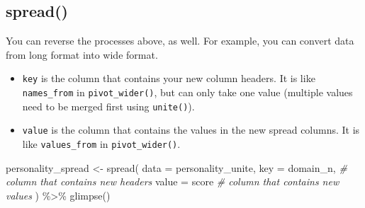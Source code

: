 \documentclass[
  oneside]{book}
\newenvironment{Shaded}{\begin{snugshade}}{\end{snugshade}}
\newcommand{\AttributeTok}[1]{\textcolor[rgb]{0.77,0.63,0.00}{#1}}
\newcommand{\CommentTok}[1]{\textcolor[rgb]{0.56,0.35,0.01}{\textit{#1}}}
\newcommand{\FunctionTok}[1]{\textcolor[rgb]{0.00,0.00,0.00}{#1}}
\newcommand{\NormalTok}[1]{#1}
\newcommand{\OtherTok}[1]{\textcolor[rgb]{0.56,0.35,0.01}{#1}}
\newcommand{\SpecialCharTok}[1]{\textcolor[rgb]{0.00,0.00,0.00}{#1}}
\providecommand{\tightlist}{%
  \setlength{\itemsep}{0pt}\setlength{\parskip}{0pt}}
\begin{document}
\hypertarget{spread}{%
\subsection{spread()}\label{spread}}

You can reverse the processes above, as well. For example, you can convert data from long format into wide format.

\begin{itemize}
\tightlist
\item
  \texttt{key} is the column that contains your new column headers. It is like \texttt{names\_from} in \texttt{pivot\_wider()}, but can only take one value (multiple values need to be merged first using \texttt{unite()}).
\item
  \texttt{value} is the column that contains the values in the new spread columns. It is like \texttt{values\_from} in \texttt{pivot\_wider()}.
\end{itemize}

\begin{Shaded}
\begin{Highlighting}[]
\NormalTok{personality\_spread }\OtherTok{\textless{}{-}} \FunctionTok{spread}\NormalTok{(}
  \AttributeTok{data =}\NormalTok{ personality\_unite,}
  \AttributeTok{key =}\NormalTok{ domain\_n, }\CommentTok{\# column that contains new headers}
  \AttributeTok{value =}\NormalTok{ score   }\CommentTok{\# column that contains new values}
\NormalTok{) }\SpecialCharTok{\%\textgreater{}\%}
  \FunctionTok{glimpse}\NormalTok{()}
\end{Highlighting}
\end{Shaded}
\end{document}
